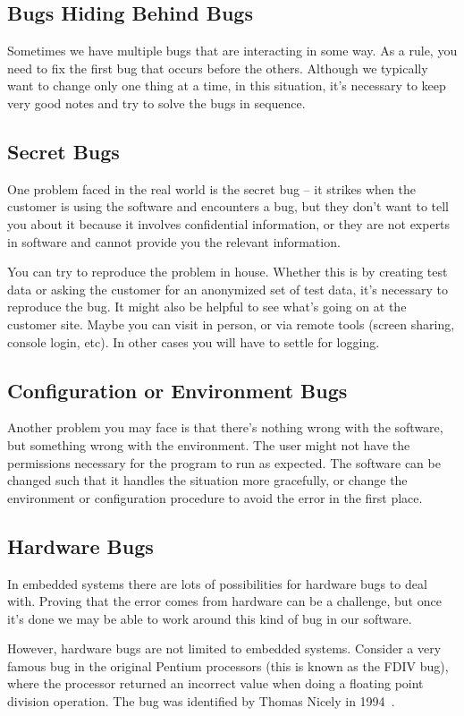\subsection*{Bugs Hiding Behind Bugs}
Sometimes we have multiple bugs that are interacting in some way. As a rule, you need to fix the first bug that occurs before the others. Although we typically want to change only one thing at a time, in this situation, it's necessary to keep very good notes and try to solve the bugs in sequence.

\subsection*{Secret Bugs}
One problem faced in the real world is the secret bug -- it strikes when the customer is using the software and encounters a bug, but they don't want to tell you about it because it involves confidential information, or they are not experts in software and cannot provide you the relevant information.

You can try to reproduce the problem in house. Whether this is by creating test data or asking the customer for an anonymized set of test data, it's necessary to reproduce the bug. It might also be helpful to see what's going on at the customer site. Maybe you can visit in person, or via remote tools (screen sharing, console login, etc). In other cases you will have to settle for logging.

\subsection*{Configuration or Environment Bugs}
Another problem you may face is that there's nothing wrong with the software, but something wrong with the environment. The user might not have the permissions necessary for the program to run as expected. The software can be changed such that it handles the situation more gracefully, or change the environment or configuration procedure to avoid the error in the first place.

\subsection*{Hardware Bugs}
In embedded systems there are lots of possibilities for hardware bugs to deal with. Proving that the error comes from hardware can be a challenge, but once it's done we may be able to work around this kind of bug in our software.  

However, hardware bugs are not limited to embedded systems. Consider a very famous bug in the original Pentium processors (this is known as the FDIV bug), where the processor returned an incorrect value when doing a floating point division operation. The bug was identified by Thomas Nicely in 1994~\cite{fdiv}.

